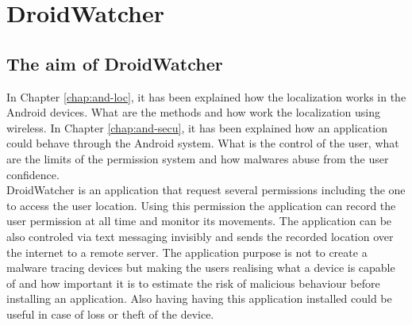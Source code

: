 
\chapter{DroidWatcher}
\label{chap:droidwatcher}




\section{The aim of DroidWatcher}

In Chapter \ref{chap:and-loc}, it has been explained how the localization works in the Android devices.
What are the methods and how work the localization using wireless.
In Chapter \ref{chap:and-secu}, it has been explained how an application could behave through the Android system.
What is the control of the user, what are the limits of the permission system and how malwares abuse from the user confidence.\\

DroidWatcher is an application that request several permissions including the one to access the user location.
Using this permission the application can record the user permission at all time and monitor its movements.
The application can be also controled via text messaging invisibly and sends the recorded location over the internet to a remote server.
The application purpose is not to create a malware tracing devices but making the users realising what a device is capable of and how important it is to estimate the risk of malicious behaviour before installing an application.
Also having having this application installed could be useful in case of loss or theft of the device.\\

